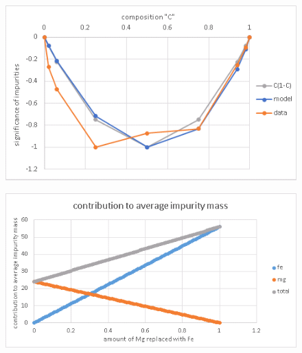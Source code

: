 \begin{figure}[p]
  \includegraphics[width=\linewidth]{Figures/gk_mfp_ph-d_significance_4000K.png}
  \caption[gk mfp ph-d significance 4000K]{}
  \label{fig:gk_mfp_ph-d_significance_4000K}
\end{figure}

\begin{figure}[h!]
  \includegraphics[width=\linewidth]{Figures/gk_mfp_ph-d_mass_demo.png}
  \caption[gk mfp ph-d mass demo]{}
  \label{fig:gk_mfp_ph-d_mass_demo}
\end{figure}






\pagebreak
